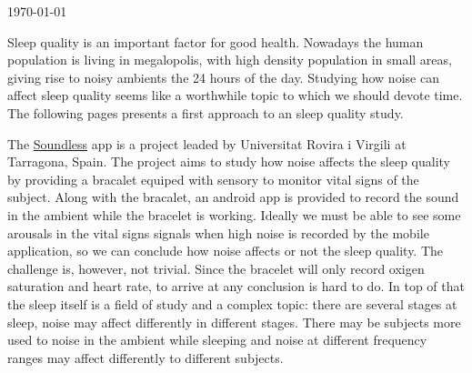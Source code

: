 \begin{titlepage}
	
	
	\vfill\vfill\vfill %
	
	{\large\today} %
	
	
	 
	
	\vfill %
	
\end{titlepage}



\tableofcontents

Sleep quality is an important factor for good health. Nowadays the human population is living in megalopolis, with high density population in small areas, giving rise to noisy ambients the 24 hours of the day. Studying how noise can affect sleep quality seems like a worthwhile topic to which we should devote time. The following pages presents a first approach to an sleep quality study.

The \href{https://soundless.app}{Soundless} app is a project leaded by Universitat Rovira i Virgili at Tarragona, Spain. The project aims to study how noise affects the sleep quality by providing a bracalet equiped with sensory to monitor vital signs of the subject. Along with the bracalet, an android app is provided to record the sound in the ambient while the bracelet is working. Ideally we must be able to see some arousals in the vital signs signals when high noise is recorded by the mobile application, so we can conclude how noise affects or not the sleep quality. The challenge is, however, not trivial. Since the bracelet will only record oxigen saturation and heart rate, to arrive at any conclusion is hard to do. In top of that the sleep itself is a field of study and a complex topic: there are several stages at sleep, noise may affect differently in different stages. There may be subjects more used to noise in the ambient while sleeping and noise at different frequency ranges may affect differently to different subjects.

